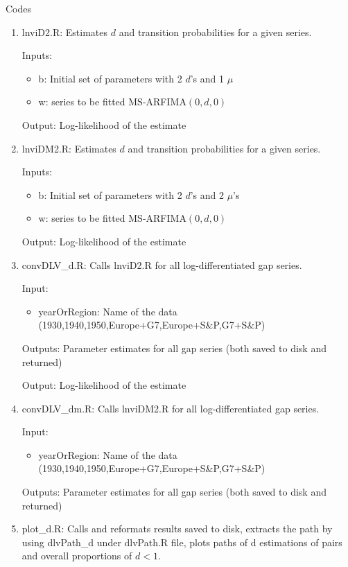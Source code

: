 \documentclass{article}
\begin{document}
\begin{flushleft}
	\large Codes
\end{flushleft}
\begin{enumerate}
	\item lnviD2.R: Estimates $ d $ and transition probabilities for a given series.

	Inputs:
		 \begin{itemize}
		 	\item b: Initial set of parameters with 2 $ d $'s and 1 $ \mu $
		 	\item w: series to be fitted MS-ARFIMA$ (0,d,0) $
		 \end{itemize}
		 
	Output: Log-likelihood of the estimate
	
	\item lnviDM2.R: Estimates $ d $ and transition probabilities for a given series.

Inputs:
\begin{itemize}
	\item b: Initial set of parameters with 2 $ d $'s and 2 $ \mu $'s
	\item w: series to be fitted MS-ARFIMA$ (0,d,0) $
\end{itemize}

Output: Log-likelihood of the estimate
	\item convDLV\_d.R: Calls lnviD2.R for all log-differentiated gap series.
	
		Input:
		\begin{itemize}
			
			\item yearOrRegion: Name of the data (1930,1940,1950,Europe+G7,Europe+S\&P,G7+S\&P)

		\end{itemize}
		
		Outputs: Parameter estimates for all gap series (both saved to disk and returned)
		
Output: Log-likelihood of the estimate
\item convDLV\_dm.R: Calls lnviDM2.R for all log-differentiated gap series.

Input:
\begin{itemize}
	
	\item yearOrRegion: Name of the data (1930,1940,1950,Europe+G7,Europe+S\&P,G7+S\&P)
	
\end{itemize}

Outputs: Parameter estimates for all gap series (both saved to disk and returned)
	\item plot\_d.R: Calls and reformats results saved to disk, extracts the path by using dlvPath\_d under dlvPath.R file, plots paths of d estimations of pairs and overall proportions of $ d < 1 $.
	

\end{enumerate}
\end{document}
